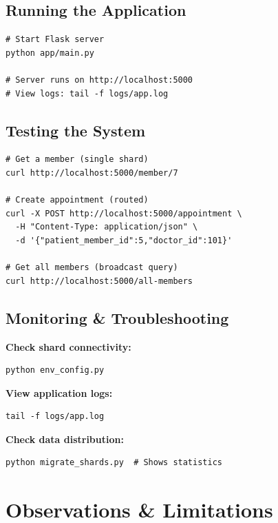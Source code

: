 \documentclass[12pt,a4paper]{article}
\begin{document}
\subsection{Running the Application}

\begin{lstlisting}[caption=Run Application]
# Start Flask server
python app/main.py

# Server runs on http://localhost:5000
# View logs: tail -f logs/app.log
\end{lstlisting}

\subsection{Testing the System}

\begin{lstlisting}[caption=API Test Examples]
# Get a member (single shard)
curl http://localhost:5000/member/7

# Create appointment (routed)
curl -X POST http://localhost:5000/appointment \
  -H "Content-Type: application/json" \
  -d '{"patient_member_id":5,"doctor_id":101}'

# Get all members (broadcast query)
curl http://localhost:5000/all-members
\end{lstlisting}

\subsection{Monitoring \& Troubleshooting}

\textbf{Check shard connectivity:}
\begin{lstlisting}
python env_config.py
\end{lstlisting}

\textbf{View application logs:}
\begin{lstlisting}
tail -f logs/app.log
\end{lstlisting}

\textbf{Check data distribution:}
\begin{lstlisting}
python migrate_shards.py  # Shows statistics
\end{lstlisting}

\section{Observations \& Limitations}
\end{document}
